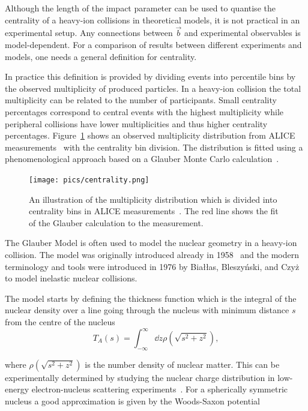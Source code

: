 Although the length of the impact parameter can be used to quantise the centrality of a heavy-ion collisions in theoretical models, it is not practical in an experimental setup. Any connections between $\vec b$ and experimental observables is model-dependent. For a comparison of results between different experiments and models, one needs a general definition for centrality.

In practice this definition is provided by dividing events into percentile bins by the observed multiplicity of produced particles. In a heavy-ion collision the total multiplicity can be related to the number of participants. Small centrality percentages correspond to central events with the highest multiplicity while peripheral collisions have lower multiplicities and thus higher centrality percentages. Figure~\ref{fig:centrality} shows an observed multiplicity distribution from ALICE measurements~\cite{PhysRevC.88.044909} with the centrality bin division. The distribution is fitted using a phenomenological approach based on a Glauber Monte Carlo calculation~\cite{Miller:2007ri}.

\begin{figure}[tb]
\centering

               \texttt{[image: pics/centrality.png]}
        \caption[An illustration of the multiplicity distribution in ALICE measurement with centrality classes.]{An illustration of the multiplicity distribution which is divided into centrality bins in ALICE measurements~\cite{PhysRevC.88.044909}. The red line shows the fit of the Glauber calculation to the measurement.}
        	\label{fig:centrality}
\end{figure}


The Glauber Model is often used to model the nuclear geometry in a heavy-ion collision. The model was originally introduced already in 1958~\cite{Glauber:1959} and the modern terminology and tools were introduced in 1976 by Białłas, Bleszyński, and Czyż~\cite{Biallas1976461} to model inelastic nuclear collisions.


The model starts by defining the thickness function which is the integral of the nuclear density over a line going through the nucleus with minimum distance $s$ from the centre
of the nucleus
\begin{equation}
T_A\left(s\right)=\int_{-\infty}^{\infty}\dd z \rho\left(\sqrt{s^2+z^2}\right),
\end{equation}

\noindent where $ \rho\left(\sqrt{s^2+z^2}\right)$ is the number density of nuclear matter. This can be experimentally determined by studying the nuclear charge distribution in low-energy electron-nucleus scattering experiments~\cite{Miller:2007ri,DeJager:1987qc}. For a spherically symmetric nucleus a good approximation is given by the Woods-Saxon potential~\cite{Abelev:2013qoq}

